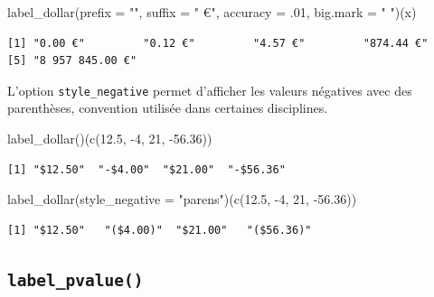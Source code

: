 \documentclass[
  letterpaper,
  DIV=11,
  numbers=noendperiod,
  oneside]{scrreprt}
\newenvironment{Shaded}{\begin{snugshade}}{\end{snugshade}}
\newcommand{\AttributeTok}[1]{\textcolor[rgb]{0.40,0.45,0.13}{#1}}
\newcommand{\DecValTok}[1]{\textcolor[rgb]{0.68,0.00,0.00}{#1}}
\newcommand{\FloatTok}[1]{\textcolor[rgb]{0.68,0.00,0.00}{#1}}
\newcommand{\FunctionTok}[1]{\textcolor[rgb]{0.28,0.35,0.67}{#1}}
\newcommand{\NormalTok}[1]{\textcolor[rgb]{0.00,0.23,0.31}{#1}}
\newcommand{\SpecialCharTok}[1]{\textcolor[rgb]{0.37,0.37,0.37}{#1}}
\newcommand{\StringTok}[1]{\textcolor[rgb]{0.13,0.47,0.30}{#1}}
\begin{document}
\begin{Shaded}
\begin{Highlighting}[]
\FunctionTok{label\_dollar}\NormalTok{(}\AttributeTok{prefix =} \StringTok{""}\NormalTok{, }\AttributeTok{suffix =} \StringTok{" €"}\NormalTok{, }\AttributeTok{accuracy =}\NormalTok{ .}\DecValTok{01}\NormalTok{, }\AttributeTok{big.mark =} \StringTok{" "}\NormalTok{)(x)}
\end{Highlighting}
\end{Shaded}

\begin{verbatim}
[1] "0.00 €"         "0.12 €"         "4.57 €"         "874.44 €"      
[5] "8 957 845.00 €"
\end{verbatim}

L'option \texttt{style\_negative} permet d'afficher les valeurs
négatives avec des parenthèses, convention utilisée dans certaines
disciplines.

\begin{Shaded}
\begin{Highlighting}[]
\FunctionTok{label\_dollar}\NormalTok{()(}\FunctionTok{c}\NormalTok{(}\FloatTok{12.5}\NormalTok{, }\SpecialCharTok{{-}}\DecValTok{4}\NormalTok{, }\DecValTok{21}\NormalTok{, }\SpecialCharTok{{-}}\FloatTok{56.36}\NormalTok{))}
\end{Highlighting}
\end{Shaded}

\begin{verbatim}
[1] "$12.50"  "-$4.00"  "$21.00"  "-$56.36"
\end{verbatim}

\begin{Shaded}
\begin{Highlighting}[]
\FunctionTok{label\_dollar}\NormalTok{(}\AttributeTok{style\_negative =} \StringTok{"parens"}\NormalTok{)(}\FunctionTok{c}\NormalTok{(}\FloatTok{12.5}\NormalTok{, }\SpecialCharTok{{-}}\DecValTok{4}\NormalTok{, }\DecValTok{21}\NormalTok{, }\SpecialCharTok{{-}}\FloatTok{56.36}\NormalTok{))}
\end{Highlighting}
\end{Shaded}

\begin{verbatim}
[1] "$12.50"   "($4.00)"  "$21.00"   "($56.36)"
\end{verbatim}

\hypertarget{label_pvalue}{%
\subsection{\texorpdfstring{\texttt{label\_pvalue()}}{label\_pvalue()}}\label{label_pvalue}}
\end{document}
